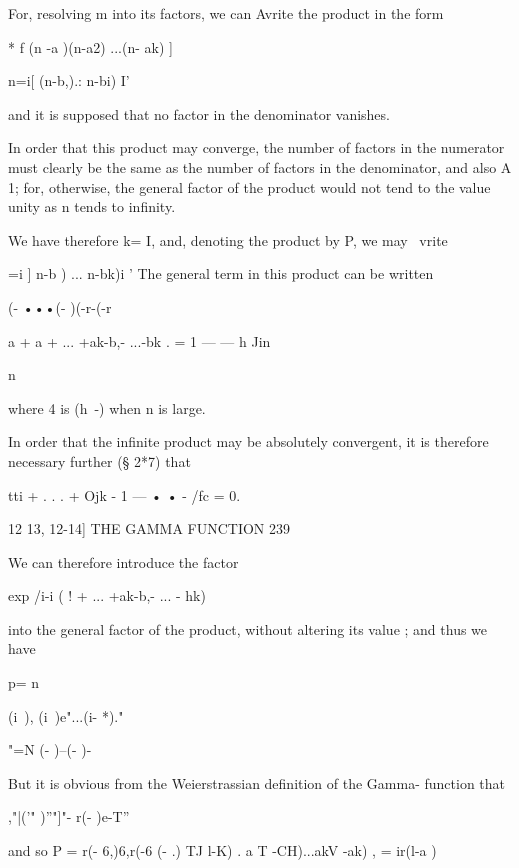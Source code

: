 For, resolving m into its factors, we can Avrite the product in the
form

* f (n -a )(n-a2) ...(n- ak) ]

n=i[ (n-b,).: n-bi) I'

and it is supposed that no factor in the denominator vanishes.

In order that this product may converge, the number of factors in the
numerator must clearly be the same as the number of factors in the
denominator, and also A 1; for, otherwise, the general factor of the
product would not tend to the value unity as n tends to infinity.

We have therefore k= I, and, denoting the product by P, we may \ vrite

 =i ] n-b ) ... n-bk)i ' The general term in this product can be
written

(- •••(- )(-r-(-r

a + a + ... +ak-b,- ...-bk . = 1 — — h Jin

n

where 4 is (h~-) when n is large.

In order that the infinite product may be absolutely convergent, it is
therefore necessary further (§ 2*7) that

tti + . . . + Ojk - 1 — • • - /fc = 0.



12 13, 12-14] THE GAMMA FUNCTION 239

We can therefore introduce the factor



exp /i-i ( ! + ... +ak-b,- ... - hk)



into the general factor of the product, without altering its value ;
and thus we have



p= n



(i\ ), (i\ )e"...(i- *)."



"=N (- )--(- )-



But it is obvious from the Weierstrassian definition of the Gamma-
function that



,"|('" )''"]"- r(- )e-T''



and so P = r(- 6,)6,r(-6 (- .) TJ l-K) . a T -CH)...akV -ak) , =
ir(l-a )

